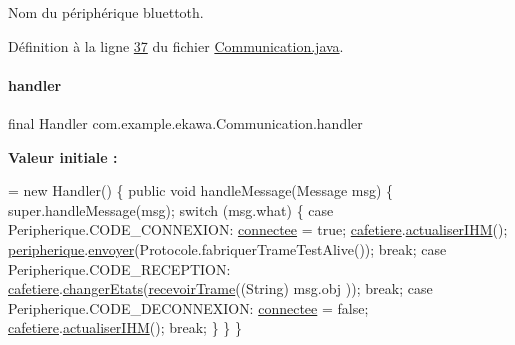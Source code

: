 Nom du périphérique bluettoth. 



Définition à la ligne \hyperlink{_communication_8java_source_l00037}{37} du fichier \hyperlink{_communication_8java_source}{Communication.\+java}.

\mbox{\label{classcom_1_1example_1_1ekawa_1_1_communication_ae1e1b4415de23491b36f0bd70da2f164}} 
\paragraph{\texorpdfstring{handler}{handler}}
{\footnotesize\ttfamily final Handler com.\+example.\+ekawa.\+Communication.\+handler\hspace{0.3cm}{\ttfamily [private]}}

{\bfseries Valeur initiale \+:}
\begin{DoxyCode}
= \textcolor{keyword}{new} Handler()
    \{
        \textcolor{keyword}{public} \textcolor{keywordtype}{void} handleMessage(Message msg)
        \{
            super.handleMessage(msg);
            \textcolor{keywordflow}{switch} (msg.what)
            \{
                \textcolor{keywordflow}{case} Peripherique.CODE\_CONNEXION:
                    \hyperlink{classcom_1_1example_1_1ekawa_1_1_communication_a93d9caaa9d4454a32d9dc28a6f22d2eb}{connectee} = \textcolor{keyword}{true};
                    \hyperlink{classcom_1_1example_1_1ekawa_1_1_communication_a3b69b78cdf60bc35b2e3e564519dc1b6}{cafetiere}.\hyperlink{classcom_1_1example_1_1ekawa_1_1_cafetiere_ad8c8b7d410315f55a216de809571fd87}{actualiserIHM}();
                    \hyperlink{classcom_1_1example_1_1ekawa_1_1_communication_a59a25b4807148701560e4341f79c0c16}{peripherique}.\hyperlink{classcom_1_1example_1_1ekawa_1_1_peripherique_ac1361bc1a445b00c4c7ebb56dfee274d}{envoyer}(Protocole.fabriquerTrameTestAlive());
                    \textcolor{keywordflow}{break};
                \textcolor{keywordflow}{case} Peripherique.CODE\_RECEPTION:
                    \hyperlink{classcom_1_1example_1_1ekawa_1_1_communication_a3b69b78cdf60bc35b2e3e564519dc1b6}{cafetiere}.\hyperlink{classcom_1_1example_1_1ekawa_1_1_cafetiere_aba42bba06ffbf08735d7f548bcce9f42}{changerEtats}(\hyperlink{classcom_1_1example_1_1ekawa_1_1_communication_a0ca98776b3fe48fa76e134607edb7871}{recevoirTrame}((String) msg.obj
      ));
                    \textcolor{keywordflow}{break};
                \textcolor{keywordflow}{case} Peripherique.CODE\_DECONNEXION:
                    \hyperlink{classcom_1_1example_1_1ekawa_1_1_communication_a93d9caaa9d4454a32d9dc28a6f22d2eb}{connectee} = \textcolor{keyword}{false};
                    \hyperlink{classcom_1_1example_1_1ekawa_1_1_communication_a3b69b78cdf60bc35b2e3e564519dc1b6}{cafetiere}.\hyperlink{classcom_1_1example_1_1ekawa_1_1_cafetiere_ad8c8b7d410315f55a216de809571fd87}{actualiserIHM}();
                    \textcolor{keywordflow}{break};
            \}
        \}
    \}
\end{DoxyCode}


